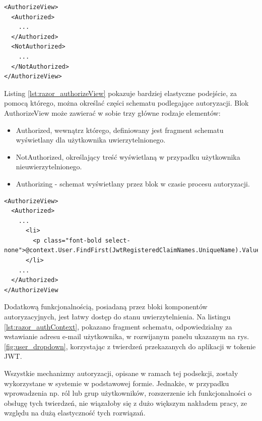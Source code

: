 \begin{lstlisting}[language=CSharp, caption={Blok widoku autoryzowanego AuthorizeView}, label=lst:razor_authorizeView]
<AuthorizeView>
  <Authorized>
    ...
  </Authorized>
  <NotAuthorized>
    ...
  </NotAuthorized>
</AuthorizeView>
\end{lstlisting}

Listing \ref{lst:razor_authorizeView} pokazuje bardziej elastyczne podejście, za pomocą którego, można określać części schematu podlegające autoryzacji. Blok AuthorizeView może zawierać w sobie trzy główne rodzaje elementów:

\begin{itemize}
    \item Authorized, wewnątrz którego, definiowany jest fragment schematu wyświetlany dla użytkownika uwierzytelnionego.
    \item NotAuthorized, określający treść wyświetlaną w przypadku użytkownika nieuwierzytelnionego.
    \item Authorizing - schemat wyświetlany przez blok w czasie procesu autoryzacji.
\end{itemize}

\begin{lstlisting}[language=CSharp, caption={Dostęp do stanu uwierzytelnienia wewnątrz bloku AuthorizeView>Authorize}, label=lst:razor_authContext]
<AuthorizeView>
  <Authorized>
    ...
      <li>
        <p class="font-bold select-none">@context.User.FindFirst(JwtRegisteredClaimNames.UniqueName).Value</p>
      </li>
    ...
  </Authorized>
</AuthorizeView
\end{lstlisting}

Dodatkową funkcjonalnością, posiadaną przez bloki komponentów autoryzacyjnych, jest łatwy dostęp do stanu uwierzytelnienia. Na listingu \ref{lst:razor_authContext}, pokazano fragment schematu, odpowiedzialny za wstawianie adresu e-mail użytkownika, w rozwijanym panelu ukazanym na rys. \ref{fig:user_dropdown}, korzystając z twierdzeń przekazanych do aplikacji w tokenie JWT.

Wszystkie mechanizmy autoryzacji, opisane w ramach tej podsekcji, zostały wykorzystane w systemie w podstawowej formie. Jednakże, w przypadku wprowadzenia np. ról lub grup użytkowników, rozszerzenie ich funkcjonalności o obsługę tych twierdzeń, nie wiązałoby się z dużo większym nakładem pracy, ze względu na dużą elastyczność tych rozwiązań.